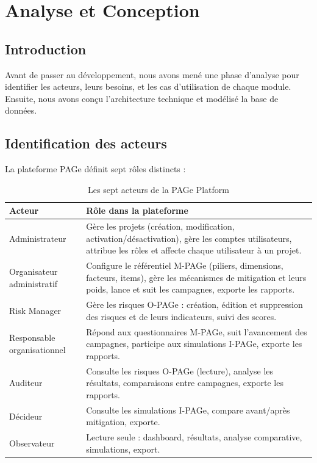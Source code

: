 \chapter{Analyse et Conception}

\section{Introduction}
Avant de passer au développement, nous avons mené une phase d'analyse pour identifier les acteurs, leurs besoins, et les cas d'utilisation de chaque module. Ensuite, nous avons conçu l'architecture technique et modélisé la base de données.

\section{Identification des acteurs}
La plateforme PAGe définit sept rôles distincts :

\begin{table}[H]
\centering
\renewcommand{\arraystretch}{1.4}
\begin{tabular}{@{}p{}p{}@{}}
\hline
\textbf{Acteur} & \textbf{Rôle dans la plateforme} \\
\hline
Administrateur & Gère les projets (création, modification, activation/désactivation), gère les comptes utilisateurs, attribue les rôles et affecte chaque utilisateur à un projet. \\
\hline
Organisateur administratif & Configure le référentiel M-PAGe (piliers, dimensions, facteurs, items), gère les mécanismes de mitigation et leurs poids, lance et suit les campagnes, exporte les rapports. \\
\hline
Risk Manager & Gère les risques O-PAGe : création, édition et suppression des risques et de leurs indicateurs, suivi des scores. \\
\hline
Responsable organisationnel & Répond aux questionnaires M-PAGe, suit l'avancement des campagnes, participe aux simulations I-PAGe, exporte les rapports. \\
\hline
Auditeur & Consulte les risques O-PAGe (lecture), analyse les résultats, comparaisons entre campagnes, exporte les rapports. \\
\hline
Décideur & Consulte les simulations I-PAGe, compare avant/après mitigation, exporte. \\
\hline
Observateur & Lecture seule : dashboard, résultats, analyse comparative, simulations, export. \\
\hline
\end{tabular}
\caption{Les sept acteurs de la PAGe Platform}
\end{table}

